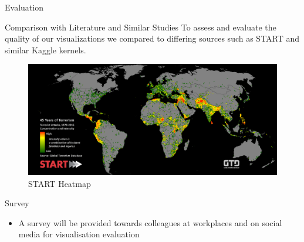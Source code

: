 \documentclass[10pt]{beamer}
\begin{document}
    


\begin{frame}{Evaluation}
    \begin{block}{Comparison with Literature and Similar Studies}
        To assess and evaluate the quality of our visualizations we compared to differing sources such as START and similar Kaggle kernels.
    \end{block}
    \begin{figure}[H]
    \centering
    \includegraphics[scale = 0.03]{START_GlobalTerrorismDatabase_TerroristAttacksConcentrationIntensityMap_45Years.png}
    \caption{START Heatmap } 
    \end{figure}
    \begin{block}{Survey}
        \begin{itemize}
            \item A survey will be provided  towards colleagues at workplaces and on social media for visualisation evaluation
        \end{itemize}
    \end{block}
\end{frame}
\end{document}
